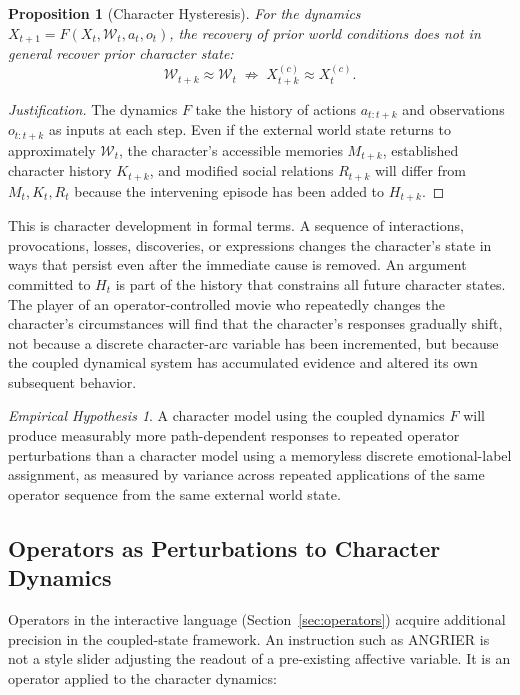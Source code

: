 \documentclass[11pt,a4paper]{article}
\theoremstyle{plain}
\newtheorem{proposition}[theorem]{Proposition}
\theoremstyle{definition}
\theoremstyle{remark}
\newtheorem{hypothesis}[theorem]{Empirical Hypothesis}
\begin{document}
\begin{proposition}[Character Hysteresis]
\label{prop:hysteresis}
For the dynamics $X_{t+1} = F(X_t, \mathcal{W}_t, a_t, o_t)$, the recovery of prior world conditions does not in general recover prior character state:
\[
\mathcal{W}_{t+k} \approx \mathcal{W}_t \;\not\Rightarrow\; X_{t+k}^{(c)} \approx X_t^{(c)}.
\]
\end{proposition}

\begin{proof}[Justification]
The dynamics $F$ take the history of actions $a_{t:t+k}$ and observations $o_{t:t+k}$ as inputs at each step. Even if the external world state returns to approximately $\mathcal{W}_t$, the character's accessible memories $M_{t+k}$, established character history $K_{t+k}$, and modified social relations $R_{t+k}$ will differ from $M_t, K_t, R_t$ because the intervening episode has been added to $H_{t+k}$.
\end{proof}

This is character development in formal terms. A sequence of interactions, provocations, losses, discoveries, or expressions changes the character's state in ways that persist even after the immediate cause is removed. An argument committed to $H_t$ is part of the history that constrains all future character states. The player of an operator-controlled movie who repeatedly changes the character's circumstances will find that the character's responses gradually shift, not because a discrete character-arc variable has been incremented, but because the coupled dynamical system has accumulated evidence and altered its own subsequent behavior.

\begin{hypothesis}
\label{hyp:hysteresis}
A character model using the coupled dynamics $F$ will produce measurably more path-dependent responses to repeated operator perturbations than a character model using a memoryless discrete emotional-label assignment, as measured by variance across repeated applications of the same operator sequence from the same external world state.
\end{hypothesis}

\subsection{Operators as Perturbations to Character Dynamics}

Operators in the interactive language (Section~\ref{sec:operators}) acquire additional precision in the coupled-state framework. An instruction such as \textsc{ANGRIER} is not a style slider adjusting the readout of a pre-existing affective variable. It is an operator applied to the character dynamics:
\end{document}
